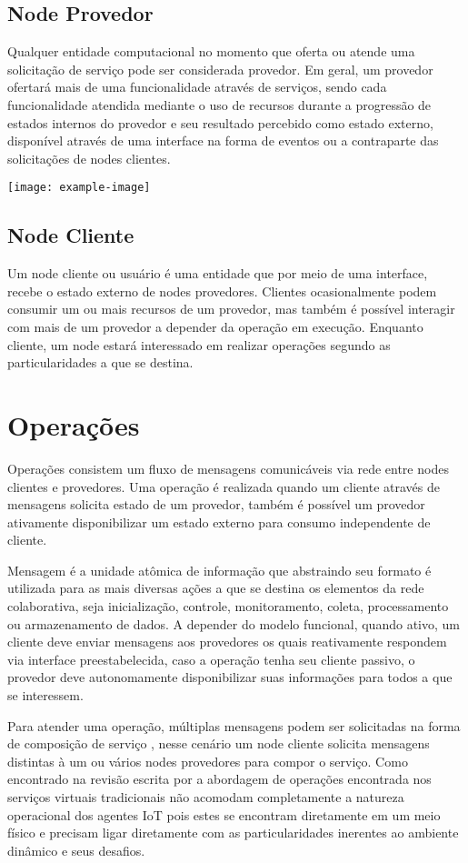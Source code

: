 \subsection{Node Provedor}
Qualquer entidade computacional no momento que oferta ou atende uma solicitação de serviço pode ser considerada provedor. Em geral, um provedor ofertará mais de uma funcionalidade através de serviços, sendo cada funcionalidade atendida mediante o uso de recursos durante a progressão de estados internos do provedor e seu resultado percebido como estado externo, disponível através de uma interface na forma de eventos ou a contraparte das solicitações de nodes clientes.

\noindent\texttt{[image: example-image]} 

\subsection{Node Cliente}
Um node cliente ou usuário é uma entidade que por meio de uma interface, recebe o estado externo de nodes provedores. Clientes ocasionalmente podem consumir um ou mais recursos de um provedor, mas também é possível interagir com mais de um provedor a depender da operação em execução. Enquanto cliente, um node estará interessado em realizar operações segundo as particularidades a que se destina.

\section{Operações}
Operações consistem um fluxo de mensagens comunicáveis via rede entre nodes clientes e provedores. Uma operação é realizada quando um cliente através de mensagens solicita estado de um provedor, também é possível um provedor ativamente disponibilizar um estado externo para consumo independente de cliente. 

Mensagem é a unidade atômica de informação que abstraindo seu formato é utilizada para as mais diversas ações a que se destina os elementos da rede colaborativa, seja inicialização, controle, monitoramento, coleta, processamento ou armazenamento de dados. A depender do modelo funcional, quando ativo, um cliente deve enviar mensagens aos provedores os quais reativamente respondem via interface preestabelecida, caso a operação tenha seu cliente passivo, o provedor deve autonomamente disponibilizar suas informações para todos a que se interessem. 

Para atender uma operação, múltiplas mensagens podem ser solicitadas na forma de composição de serviço \cite{service_composition}, nesse cenário um node cliente solicita mensagens distintas à um ou vários nodes provedores para compor o serviço. Como encontrado na revisão escrita por \cite{kahloul_service_2019} a abordagem de operações encontrada nos serviços virtuais tradicionais não acomodam completamente a natureza operacional dos agentes IoT pois estes se encontram diretamente em um meio físico e precisam ligar diretamente com as particularidades inerentes ao ambiente dinâmico e seus desafios.

